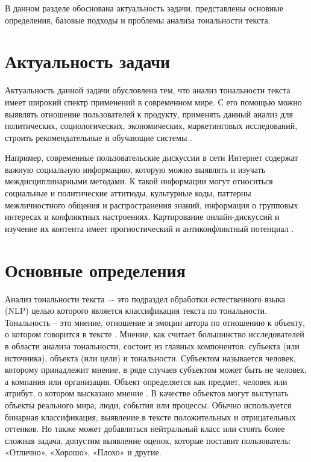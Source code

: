 \documentclass[a4paper,14pt, unknownkeysallowed]{extreport}
\begin{document}
В данном разделе обоснована актуальность задачи, представлены основные определения, базовые подходы и проблемы анализа тональности текста.

\section{Актуальность задачи}

Актуальность данной задачи обусловлена тем, что анализ тональности текста имеет широкий спектр применений в современном мире. С его помощью можно выявлять отношение пользователей к продукту, применять данный анализ для политических, социологических, экономических, маркетинговых исследований, строить рекомендательные и обучающие системы \cite{Samigulin}.

Например, современные пользовательские дискуссии в сети Интернет содержат важную социальную информацию, которую можно выявлять и изучать междисциплинарными методами. К такой информации могут относиться социальные и политические аттитюды, культурные коды, паттерны межличностного общения и распространения знаний, информация о групповых интересах и конфликтных настроениях. Картирование онлайн-дискуссий и изучение их контента имеет прогностический и антиконфликтный потенциал \cite{Bodrunova}.

\section{Основные определения}

Анализ тональности текста –- это подраздел обработки естественного языка (NLP) целью которого является классификация текста по тональности. Тональность -- это мнение, отношение и эмоции автора по отношению к объекту, о котором говорится в тексте \cite{Samigulin}. Мнение, как считает большинство исследователей в области анализа тональности, состоит из главных компонентов: субъекта (или источника), объекта (или цели) и тональности. Субъектом называется человек, которому принадлежит мнение, в ряде случаев субъектом может быть не человек, а компания или организация. Объект определяется как предмет, человек или атрибут, о котором высказано мнение \cite{Semina1}. В качестве объектов могут выступать объекты реального мира, люди, события или процессы. Обычно используется бинарная классификация, выявление в тексте положительных и отрицательных оттенков. Но также может добавляться нейтральный класс или стоять более сложная задача, допустим выявление оценок, которые поставит пользователь: «Отлично», «Хорошо», «Плохо» и другие.
\end{document}
